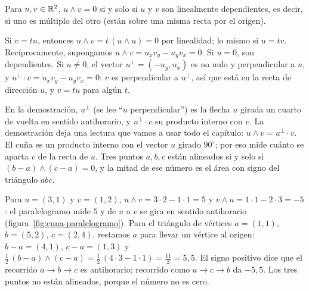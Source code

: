 \begin{proposicion}\label{prop:cuna-dependencia}
Para \(u,v\in\mathbb{R}^2\), \(u\wedge v=0\) si y solo si \(u\) y \(v\) son linealmente dependientes,
es decir, si uno es múltiplo del otro (están sobre una misma recta por el origen).
\end{proposicion}

\begin{demostracion}
Si \(v=tu\), entonces \(u\wedge v=t\,(u\wedge u)=0\) por linealidad; lo mismo si \(u=tv\).
Recíprocamente, supongamos \(u\wedge v=u_xv_y-u_yv_x=0\). Si \(u=0\), son dependientes. Si
\(u\neq0\), el vector \(u^\perp=(-u_y,u_x)\) es no nulo y perpendicular a \(u\), y
\(u^\perp\cdot v=u_xv_y-u_yv_x=0\): \(v\) es perpendicular a \(u^\perp\), así que está en la
recta de dirección \(u\), y \(v=tu\) para algún \(t\).
\end{demostracion}

En la demostración, \(u^\perp\) (se lee \enquote{\(u\) perpendicular}) es la flecha \(u\)
girada un cuarto de vuelta en sentido antihorario, y \(u^\perp\cdot v\) su producto interno
con \(v\). La demostración deja una lectura que vamos a usar todo el capítulo:
\(u\wedge v=u^\perp\cdot v\). El cuña es un producto interno con el vector \(u\) girado
\(90^\circ\); por eso mide cuánto se aparta \(v\) de la recta de \(u\). Tres puntos \(a,b,c\)
están alineados si y solo si \((b-a)\wedge(c-a)=0\), y la mitad de ese número es el área con
signo del triángulo \(abc\).

\begin{ejemplo}\label{ej:cuna-area}
Para \(u=(3,1)\) y \(v=(1,2)\), \(u\wedge v=3\cdot2-1\cdot1=5\) y
\(v\wedge u=1\cdot1-2\cdot3=-5\): el paralelogramo mide \(5\) y de \(u\) a \(v\) se gira en sentido antihorario
(figura~\ref{fig:cuna-paralelogramo}). Para el triángulo de vértices \(a=(1,1)\),
\(b=(5,2)\), \(c=(2,4)\), restamos \(a\) para llevar un vértice al origen: \(b-a=(4,1)\),
\(c-a=(1,3)\) y \(\tfrac12\,(b-a)\wedge(c-a)=\tfrac12\,(4\cdot3-1\cdot1)=\tfrac{11}2=5{,}5\).
El signo positivo dice que el recorrido \(a\to b\to c\) es antihorario; recorrido como
\(a\to c\to b\) da \(-5{,}5\). Los tres puntos no están alineados, porque el número no es
cero.
\end{ejemplo}

